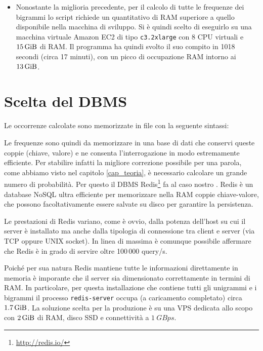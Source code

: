\begin{itemize}
\item Nonostante la miglioria precedente, per il calcolo di tutte le frequenze dei bigrammi lo script richiede un quantitativo di RAM superiore a quello disponibile nella macchina di sviluppo. Si è quindi scelto di eseguirlo su una macchina virtuale Amazon EC2 di tipo \texttt{c3.2xlarge} con 8 CPU virtuali e $\SI{15}{\gibi\byte}$ di RAM. Il programma ha quindi svolto il suo compito in 1018 secondi (circa 17 minuti), con un picco di occupazione RAM intorno ai $\SI{13}{\gibi\byte}$.
\end{itemize}

\section{Scelta del DBMS}
\label{dbms}
Le occorrenze calcolate sono memorizzate in file con la seguente sintassi:


Le frequenze sono quindi da memorizzare in una base di dati che conservi queste coppie (chiave, valore) e ne consenta l'interrogazione in modo estremamente efficiente. Per stabilire infatti la migliore correzione possibile per una parola, come abbiamo visto nel capitolo \ref{cap_teoria}, è necessario calcolare un grande numero di probabilità. Per questo il DBMS Redis\footnote{\url{http://redis.io/}} fa al caso nostro \cite{nltkredis}. Redis è un database NoSQL ultra efficiente per memorizzare nella RAM coppie chiave-valore, che possono facoltativamente essere salvate su disco per garantire la persistenza. 

Le prestazioni di Redis variano, come è ovvio, dalla potenza dell'host su cui il server è installato ma anche dalla tipologia di connessione tra client e server (via TCP oppure UNIX socket). In linea di massima è comunque possibile affermare che Redis è in grado di servire oltre 100\,000 query/s.

Poiché per sua natura Redis mantiene tutte le informazioni direttamente in memoria è imporante che il server sia dimensionato correttamente in termini di RAM. In particolare, per questa installazione che contiene tutti gli unigrammi e i bigrammi il processo \texttt{redis-server} occupa (a caricamento completato) circa $\SI{1,7}{\gibi\byte}$.
La soluzione scelta per la produzione è su una VPS dedicata allo scopo con $\SI{2}{\gibi\byte}$ di RAM, disco SSD e connettività a $\SI{1}{GBps}$.

